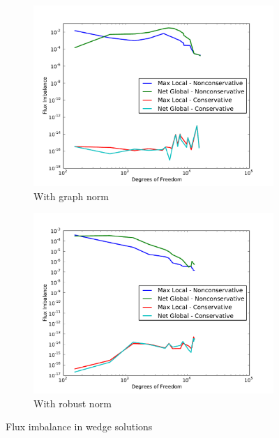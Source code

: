 \documentclass[letterpaper]{article}
\begin{document}
\begin{figure}
\centering
\begin{subfigure}[t]{0.45\textwidth}
\centering
\includegraphics[width=\textwidth]{figs/Wedge/graphFlux.pdf}
\caption{With graph norm}
\label{fig:wedgeGraphFlux}
\end{subfigure}
\begin{subfigure}[t]{0.45\textwidth}
\centering
\includegraphics[width=\textwidth]{figs/Wedge/robustFlux.pdf}
\caption{With robust norm}
\label{fig:wedgeRobustFlux}
\end{subfigure}
\caption{Flux imbalance in wedge solutions}
\label{fig:wedge_flux}
\end{figure}
\end{document}
